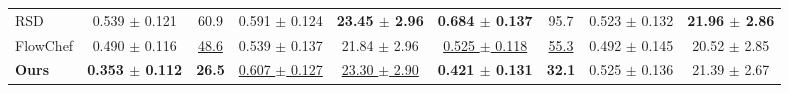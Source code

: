 \begin{table*}[htbp]
{\begin{tabular}{@{}lcccccccc@{}}
      RSD
        & 0.539 $\pm$ 0.121 & 60.9 & 0.591 $\pm$ 0.124 & \textbf{23.45 $\pm$ 2.96}
        & \textbf{0.684 $\pm$ 0.137} & 95.7 & 0.523 $\pm$ 0.132 & \textbf{21.96 $\pm$ 2.86}\\
      FlowChef
        & 0.490 $\pm$ 0.116 & \underline{48.6} & 0.539 $\pm$ 0.137 & 21.84 $\pm$ 2.96
        & \underline{0.525 $\pm$ 0.118} & \underline{55.3} & 0.492 $\pm$ 0.145 & 20.52 $\pm$ 2.85\\
      \rowcolor{myrowcolour}\textbf{Ours}
        & \textbf{0.353 $\pm$ 0.112} & \textbf{26.5} & \underline{0.607 $\pm$ 0.127} & \underline{23.30 $\pm$ 2.90}
        & \textbf{0.421 $\pm$ 0.131} & \textbf{32.1} & 0.525 $\pm$ 0.136 & 21.39 $\pm$ 2.67\\
      \bottomrule
    \end{tabular}
  }
\end{table*}

